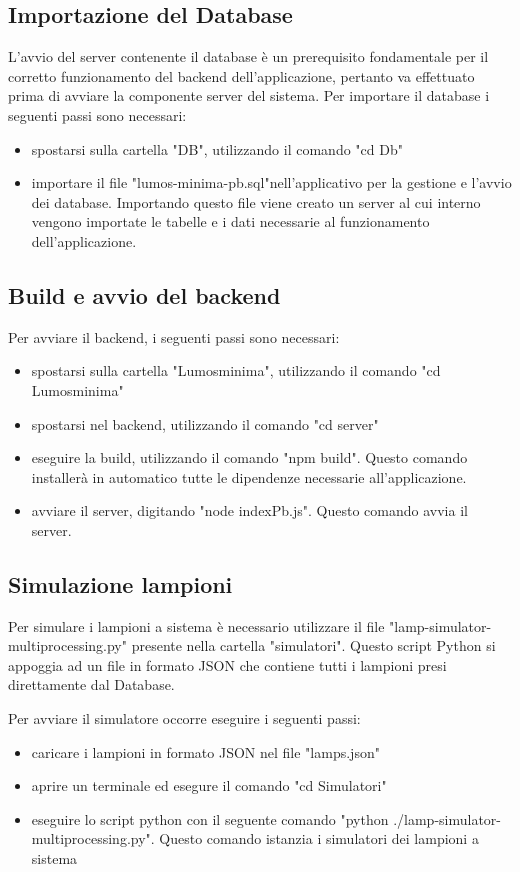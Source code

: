 \documentclass[9pt]{article}
\begin{document}
\subsection{Importazione del Database}
L'avvio del server contenente il database è un prerequisito fondamentale per il corretto funzionamento del backend dell'applicazione, pertanto va effettuato prima di avviare la componente server del sistema.
Per importare il database i seguenti passi sono necessari:
\begin{itemize}
	\item spostarsi sulla cartella "DB", utilizzando il comando "cd Db"
	\item importare il file "lumos-minima-pb.sql"nell'applicativo per la gestione e l'avvio dei database. Importando questo file viene creato un server al cui interno vengono importate le tabelle e i dati necessarie al funzionamento dell'applicazione.
\end{itemize}
\subsection{Build e avvio del backend}
Per avviare il backend, i seguenti passi sono necessari:
\begin{itemize}
	\item spostarsi sulla cartella "Lumosminima", utilizzando il comando "cd Lumosminima"
	\item spostarsi nel backend, utilizzando il comando "cd server"
	\item eseguire la build, utilizzando il comando "npm build". Questo comando installerà in automatico tutte le dipendenze necessarie all'applicazione.
	\item avviare il server, digitando "node indexPb.js". Questo comando avvia il server.
\end{itemize}

\subsection{Simulazione lampioni}
Per simulare i lampioni a sistema è necessario utilizzare il file "lamp-simulator-multiprocessing.py" presente nella cartella "simulatori".
Questo script Python si appoggia ad un file in formato JSON che contiene tutti i lampioni presi direttamente dal Database.

Per avviare il simulatore occorre eseguire i seguenti passi:
\begin{itemize}
	\item caricare i lampioni in formato JSON nel file "lamps.json"
	\item aprire un terminale ed esegure il comando "cd Simulatori"
	\item eseguire lo script python con il seguente comando "python ./lamp-simulator-multiprocessing.py". Questo comando istanzia i simulatori dei lampioni a sistema
\end{itemize}
\end{document}

